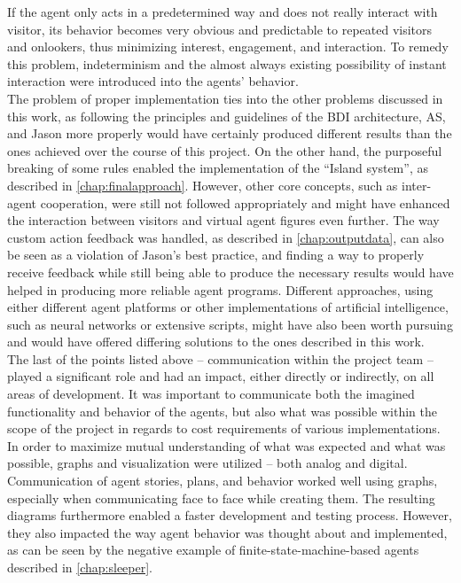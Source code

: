 \documentclass[draft,final]{vutinfth} %
\begin{document}
If the agent only acts in a predetermined way and does not really interact with visitor, its behavior becomes very obvious and predictable to repeated visitors and onlookers, thus minimizing interest, engagement, and interaction. 
To remedy this problem, indeterminism and the almost always existing possibility of instant interaction were introduced into the agents’ behavior. \\
The problem of proper implementation ties into the other problems discussed in this work, as following the principles and guidelines of the BDI architecture, AS, and Jason more properly would have certainly produced different results than the ones achieved over the course of this project.
On the other hand, the purposeful breaking of some rules enabled the implementation of the “Island system”, as described in \autoref{chap:finalapproach}. 
However, other core concepts, such as inter-agent cooperation, were still not followed appropriately and might have enhanced the interaction between visitors and virtual agent figures even further. 
The way custom action feedback was handled, as described in \autoref{chap:outputdata}, can also be seen as a violation of Jason’s best practice, and finding a way to properly receive feedback while still being able to produce the necessary results would have helped in producing more reliable agent programs. 
Different approaches, using either different agent platforms or other implementations of artificial intelligence, such as neural networks or extensive scripts, might have also been worth pursuing and would have offered differing solutions to the ones described in this work. \\
The last of the points listed above – communication within the project team – played a significant role and had an impact, either directly or indirectly, on all areas of development. 
It was important to communicate both the imagined functionality and behavior of the agents, but also what was possible within the scope of the project in regards to cost requirements of various implementations.
In order to maximize mutual understanding of what was expected and what was possible, graphs and visualization were utilized – both analog and digital. 
Communication of agent stories, plans, and behavior worked well using graphs, especially when communicating face to face while creating them. 
The resulting diagrams furthermore enabled a faster development and testing process. 
However, they also impacted the way agent behavior was thought about and implemented, as can be seen by the negative example of finite-state-machine-based agents described in \autoref{chap:sleeper}. \\
\end{document}
